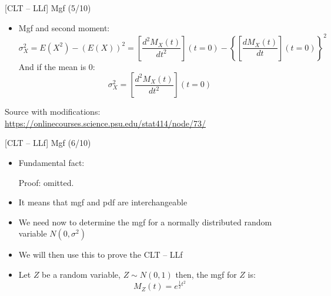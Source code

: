 \documentclass{beamer}
\begin{document}
\begin{frame}
{\centerline{[CLT -- LLf] Mgf (5/10)}}

\begin{itemize}
\item Mgf and second moment:
$$ \sigma_X^2 = E(X^2)-(E(X))^2 = \left [ \frac{d^2M_X(t)}{dt^2} \right ] (t=0) -  \left \{ \left [ \frac{dM_X(t)}{dt} \right ] (t=0) \right \}^2$$
And if the mean is 0:
$$ \sigma_X^2 =  \left [ \frac{d^2M_X(t)}{dt^2} \right ] (t=0) $$


\end{itemize}

\begin{center}
\tiny 
Source with modifications: \url{https://onlinecourses.science.psu.edu/stat414/node/73/}
\end{center}
\end{frame}


\begin{frame}
{\centerline{[CLT -- LLf] Mgf (6/10)}}

\begin{itemize}
\item Fundamental fact:
\begin{center}
\end{center}
Proof: omitted.
\item It means that mgf and pdf are interchangeable
\item We need now to determine the mgf for a normally distributed random variable $N(0,\sigma^2)$
\item We will then use this to prove the CLT -- LLf
\item Let $Z$ be a random variable, $  Z \sim N(0,1) $ then, the mgf for $Z$ is:
$$M_Z(t) = e^{\frac{1}{2}t^2}$$
\end{itemize}

\end{frame}
\end{document}

